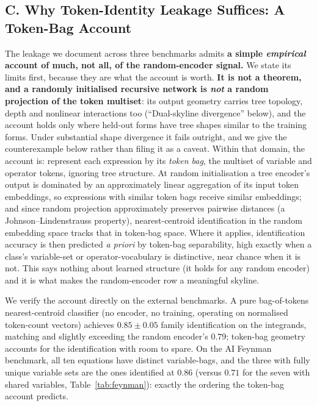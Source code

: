 \subsection*{C. Why Token-Identity Leakage Suffices: A Token-Bag Account}

The leakage we document across three benchmarks admits \textbf{a simple \emph{empirical} account of much, not all, of the random-encoder signal.} We state its limits first, because they are what the account is worth. \textbf{It is not a theorem, and a randomly initialised recursive network is \emph{not} a random projection of the token multiset}: its output geometry carries tree topology, depth and nonlinear interactions too (``Dual-skyline divergence'' below), and the account holds only where held-out forms have tree shapes similar to the training forms. Under substantial shape divergence it fails outright, and we give the counterexample below rather than filing it as a caveat. Within that domain, the account is: represent each expression by its \emph{token bag}, the multiset of variable and operator tokens, ignoring tree structure. At random initialisation a tree encoder's output is dominated by an approximately linear aggregation of its input token embeddings, so expressions with similar token bags receive similar embeddings; and since random projection approximately preserves pairwise distances (a Johnson--Lindenstrauss property), nearest-centroid identification in the random embedding space tracks that in token-bag space. Where it applies, identification accuracy is then predicted \emph{a priori} by token-bag separability, high exactly when a class's variable-set or operator-vocabulary is distinctive, near chance when it is not. This says nothing about learned structure (it holds for any random encoder) and it is what makes the random-encoder row a meaningful skyline.

We verify the account directly on the external benchmarks. A pure bag-of-tokens nearest-centroid classifier (no encoder, no training, operating on normalised token-count vectors) achieves $0.85 \pm 0.05$ family identification on the \citet{lample2019deep} integrands, matching and slightly exceeding the random encoder's $0.79$; token-bag geometry accounts for the identification with room to spare. On the AI Feynman benchmark, all ten equations have distinct variable-bags, and the three with fully unique variable sets are the ones identified at $0.86$ (versus $0.71$ for the seven with shared variables, Table~\ref{tab:feynman}): exactly the ordering the token-bag account predicts.

